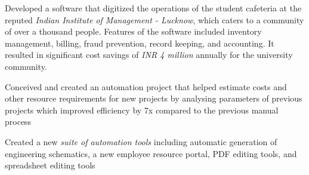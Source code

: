 \begin{minipage}[t]{0.68\textwidth}
\sectionspace %


Developed a software that digitized the operations of the student cafeteria at the reputed \textit{Indian Institute of Management - Lucknow}, which caters to a community of over a thousand people. Features of the software included inventory management, billing, fraud prevention, record keeping, and accounting. It resulted in significant cost savings of \textit{INR 4 million} annually for the university community.
\sectionspace %


\begin{tightitemize}
\item Conceived and created an automation project that helped estimate costs and other resource requirements for new projects by analysing parameters of previous projects which improved efficiency by 7x compared to the previous manual process
\item Created a new \textit{suite of automation tools} including automatic generation of engineering schematics, a new employee resource portal, PDF editing tools, and spreadsheet editing tools
\end{tightitemize}

\end{minipage} %
\hfill
%
%

